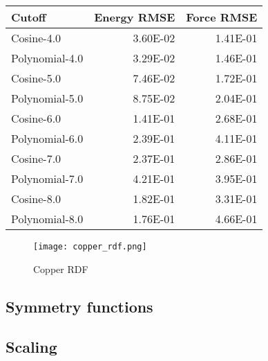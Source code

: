 \begin{tabular}{lrr}
\toprule
         Cutoff &  Energy RMSE &  Force RMSE \\
\midrule
     Cosine-4.0 &     3.60E-02 &    1.41E-01 \\
 Polynomial-4.0 &     3.29E-02 &    1.46E-01 \\
     Cosine-5.0 &     7.46E-02 &    1.72E-01 \\
 Polynomial-5.0 &     8.75E-02 &    2.04E-01 \\
     Cosine-6.0 &     1.41E-01 &    2.68E-01 \\
 Polynomial-6.0 &     2.39E-01 &    4.11E-01 \\
     Cosine-7.0 &     2.37E-01 &    2.86E-01 \\
 Polynomial-7.0 &     4.21E-01 &    3.95E-01 \\
     Cosine-8.0 &     1.82E-01 &    3.31E-01 \\
 Polynomial-8.0 &     1.76E-01 &    4.66E-01 \\
\bottomrule
\end{tabular}

\begin{figure}
    \centering
    \texttt{[image: copper\_rdf.png]}
    \caption{Copper RDF}
    \label{fig:copper_rdf}
\end{figure}

\subsection{Symmetry functions}

\subsection{Scaling}

